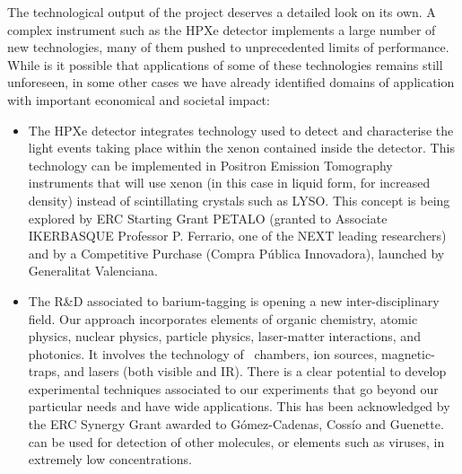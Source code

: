 The technological output of the project deserves a detailed look on its own. A complex instrument such as the HPXe detector implements a large number of new technologies, many of them pushed to unprecedented limits of performance. While is it possible that applications of some of these technologies remains still unforeseen, in some other cases we have already identified domains of application with important economical and societal impact: 

\begin{itemize}[noitemsep,topsep=0pt,parsep=0pt,partopsep=0pt]
\item The HPXe detector integrates technology used to detect and characterise the light events taking place within the xenon contained inside the detector. This technology can be implemented in Positron Emission Tomography instruments that will use xenon (in this case in liquid form, for increased density) instead of scintillating crystals such as LYSO.  This concept is being explored by ERC Starting Grant PETALO (granted to Associate IKERBASQUE Professor P. Ferrario, one of the NEXT leading researchers) and by a Competitive Purchase (Compra P\'ublica Innovadora), launched by Generalitat Valenciana.

\item The R\&D associated to barium-tagging is opening a new inter-disciplinary field. Our approach incorporates elements of organic chemistry, atomic physics, nuclear physics, particle physics, laser-matter interactions, and photonics. It involves the technology of \HPXeEL\ chambers, ion sources, magnetic-traps, and lasers (both visible and IR). There is a clear potential to develop experimental techniques associated to our experiments that go beyond our particular needs and have wide applications. This has been acknowledged by the ERC Synergy Grant awarded to G\'omez-Cadenas, Coss\'io and Guenette. can be used for detection of other molecules, or elements such as viruses, in extremely low concentrations. 
\end{itemize}
